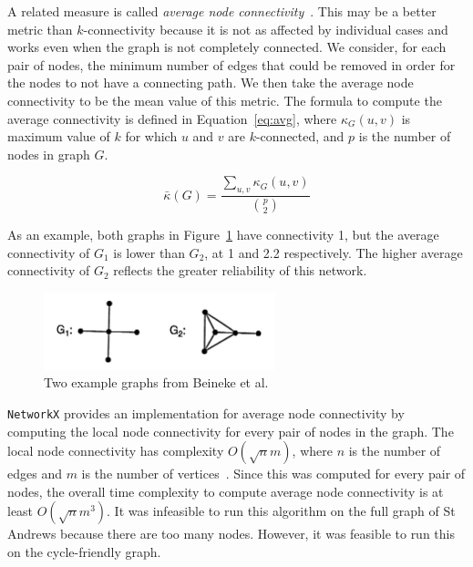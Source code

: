 \documentclass[12pt,a4paper]{report}
\begin{document}
A related measure is called \textit{average node connectivity}~\cite{BEINEKE200231}. This may be a better metric than $k$-connectivity because it is not as affected by individual cases and works even when the graph is not completely connected. We consider, for each pair of nodes, the minimum number of edges that could be removed in order for the nodes to not have a connecting path. We then take the average node connectivity to be the mean value of this metric. The formula to compute the average connectivity is defined in Equation~\ref{eq:avg}, where $\kappa_G(u, v)$ is maximum value of $k$ for which $u$ and $v$ are $k$-connected, and $p$ is the number of nodes in graph $G$.

\begin{equation}\label{eq:avg}
    \bar\kappa(G) = \frac{\sum_{u, v}\kappa_G(u, v)}{\binom{p}{2}}
\end{equation}

As an example, both graphs in Figure~\ref{fig:avg example} have connectivity 1, but the average connectivity of $G_1$ is lower than $G_2$, at 1 and 2.2 respectively. The higher average connectivity of $G_2$ reflects the greater reliability of this network.

\begin{figure}[ht!]
    \centering
    \includegraphics[width=0.6\textwidth]{diss_images/eval/avg_example.png}
    \caption{Two example graphs from Beineke et al.~\cite{BEINEKE200231}}
    \label{fig:avg example}
\end{figure}

\texttt{NetworkX} provides an implementation for average node connectivity by computing the local node connectivity for every pair of nodes in the graph. The local node connectivity has complexity $O(\sqrt{n}m)$, where $n$ is the number of edges and $m$ is the number of vertices~\cite{brandes2005}. Since this was computed for every pair of nodes, the overall time complexity to compute average node connectivity is at least $O(\sqrt{n}m^3)$. It was infeasible to run this algorithm on the full graph of St Andrews because there are too many nodes. However, it was feasible to run this on the cycle-friendly graph. 
\end{document}

